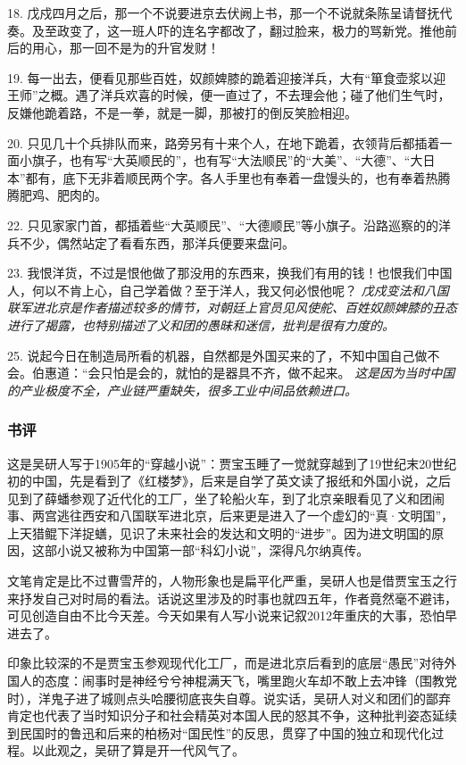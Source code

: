 18. 戊戍四月之后，那一个不说要进京去伏阙上书，那一个不说就条陈呈请督抚代奏。及至政变了，这一班人吓的连名字都改了，翻过脸来，极力的骂新党。推他前后的用心，那一回不是为的升官发财！

19. 每一出去，便看见那些百姓，奴颜婢膝的跪着迎接洋兵，大有“箪食壶浆以迎王师”之概。遇了洋兵欢喜的时候，便一直过了，不去理会他；碰了他们生气时，反嫌他跪着路，不是一拳，就是一脚，那被打的倒反笑脸相迎。

20. 只见几十个兵排队而来，路旁另有十来个人，在地下跪着，衣领背后都插着一面小旗子，也有写“大英顺民的”，也有写“大法顺民”的“大美”、“大德”、“大日本”都有，底下无非着顺民两个字。各人手里也有奉着一盘馒头的，也有奉着热腾腾肥鸡、肥肉的。


22. 只见家家门首，都插着些“大英顺民”、“大德顺民”等小旗子。沿路巡察的的洋兵不少，偶然站定了看看东西，那洋兵便要来盘问。

23. 我恨洋货，不过是恨他做了那没用的东西来，换我们有用的钱！也恨我们中国人，何以不肯上心，自己学着做？至于洋人，我又何必恨他呢？
\emph{戊戍变法和八国联军进北京是作者描述较多的情节，对朝廷上官员见风使舵、百姓奴颜婢膝的丑态进行了揭露，也特别描述了义和团的愚昧和迷信，批判是很有力度的。}


25. 说起今日在制造局所看的机器，自然都是外国买来的了，不知中国自己做不会。伯惠道：“会只怕是会的，就怕的是器具不齐，做不起来。
\emph{这是因为当时中国的产业极度不全，产业链严重缺失，很多工业中间品依赖进口。}

\subsubsection{书评}

这是吴研人写于1905年的“穿越小说”：贾宝玉睡了一觉就穿越到了19世纪末20世纪初的中国，先是看到了《红楼梦》，后来是自学了英文读了报纸和外国小说，之后见到了薛蟠参观了近代化的工厂，坐了轮船火车，到了北京亲眼看见了义和团闹事、两宫逃往西安和八国联军进北京，后来更是进入了一个虚幻的“真·文明国”，上天猎鲲下洋捉蟮，见识了未来社会的发达和文明的“进步”。因为进文明国的原因，这部小说又被称为中国第一部“科幻小说”，深得凡尔纳真传。

文笔肯定是比不过曹雪芹的，人物形象也是扁平化严重，吴研人也是借贾宝玉之行来抒发自己对时局的看法。话说这里涉及的时事也就四五年，作者竟然毫不避讳，可见创造自由不比今天差。今天如果有人写小说来记叙2012年重庆的大事，恐怕早进去了。

印象比较深的不是贾宝玉参观现代化工厂，而是进北京后看到的底层“愚民”对待外国人的态度：闹事时是神经兮兮神棍满天飞，嘴里跑火车却不敢上去冲锋（围教党时），洋鬼子进了城则点头哈腰彻底丧失自尊。说实话，吴研人对义和团们的鄙弃肯定也代表了当时知识分子和社会精英对本国人民的怒其不争，这种批判姿态延续到民国时的鲁迅和后来的柏杨对“国民性”的反思，贯穿了中国的独立和现代化过程。以此观之，吴研了算是开一代风气了。

